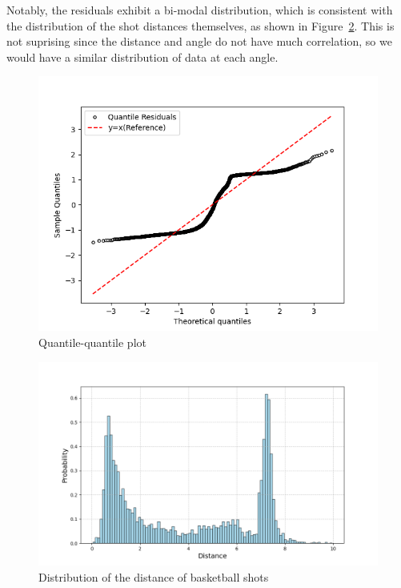 \documentclass[9pt]{IEEEtran}
\begin{document}
Notably, the residuals exhibit a bi-modal distribution, which 
is consistent with the distribution of the shot distances themselves, 
as shown in Figure~\ref{fig:distr}. This is not suprising since the distance 
and angle do not have much correlation, so we would have a similar 
distribution of data at each angle.



\begin{figure}[h]
    \centering
    \includegraphics[width=0.99\columnwidth]{figures/qq.png}
    \caption{Quantile-quantile plot}
    \label{fig:qq}
\end{figure}


\begin{figure}[h]
    \centering
    \includegraphics[width=0.99\columnwidth]{figures/distr.png}
    \caption{Distribution of the distance of basketball shots}
    \label{fig:distr}
\end{figure}
\end{document}
